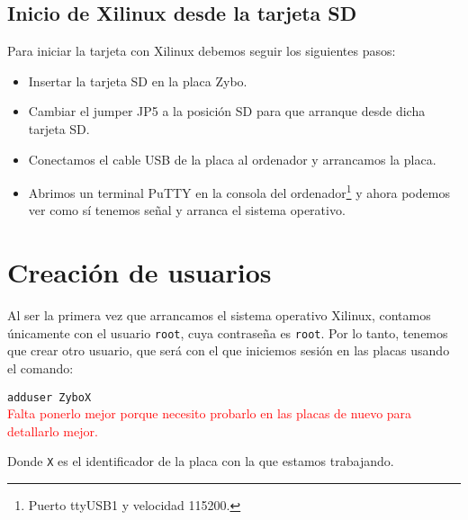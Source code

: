 \documentclass[12pt,letterpaper]{article}
\begin{document}
\subsection{Inicio de Xilinux desde la tarjeta SD}
Para iniciar la tarjeta con Xilinux debemos seguir los siguientes pasos:
\begin{itemize}
	\item Insertar la tarjeta SD en la placa Zybo.
	\item Cambiar el jumper JP5 a la posición SD para que arranque desde dicha tarjeta SD.
	\item Conectamos el cable USB de la placa al ordenador y arrancamos la placa.
	\item Abrimos un terminal PuTTY en la consola del ordenador\footnote{Puerto ttyUSB1 y velocidad 115200.} y ahora podemos ver como sí tenemos señal y arranca el sistema operativo.
\end{itemize}

\section{Creación de usuarios}
Al ser la primera vez que arrancamos el sistema operativo Xilinux, contamos únicamente con el usuario \texttt{root}, cuya contraseña es \texttt{root}. Por lo tanto, tenemos que crear otro usuario, que será con el que iniciemos sesión en las placas usando el comando:
\begin{center}
	\texttt{adduser ZyboX}
	\\\textcolor{red}{Falta ponerlo mejor porque necesito probarlo en las placas de nuevo para detallarlo mejor.}
\end{center}
Donde \texttt{X} es el identificador de la placa con la que estamos trabajando.
\end{document}
